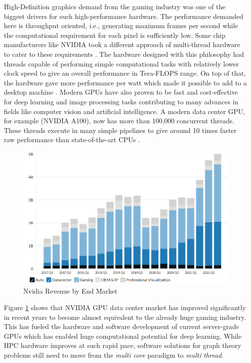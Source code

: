 High-Definition graphics demand from the gaming industry was one of the biggest drivers for such high-performance hardware. The performance demanded here is throughput oriented, i.e., generating maximum frames per second while the computational requirement for each pixel is sufficiently low.
Some chip manufacturers like NVIDIA took a different approach of multi-thread hardware  to cater to these requirements \cite{GPUs_and_gaming}.
The hardware designed with this philosophy had threads capable of performing simple computational tasks with relatively lower clock speed to give an overall performance in Tera-FLOPS range. On top of that, the hardware gave more performance per watt which made it possible to add to a desktop machine \cite{ppw_gpu_vs_cpu}.
Modern GPUs have also proven to be fast and cost-effective for deep learning and image processing tasks contributing to many advances in fields like computer vision and artificial intelligence. A modern data center GPU, for example (NVIDIA A100), now has more than 100,000 concurrent threads. These threads execute in many simple pipelines to give around 10 times faster raw performance than state-of-the-art CPUs \cite{GPU_book_wen-mei}.
\begin{figure}
    \includegraphics[width=\textwidth]{fig/Nvidia-revenue-by-end-market.png}
    \caption{Nvidia Revenue by End Market}
    \label{fig:Nvidia-revenue}
\end{figure}

Figure \ref{fig:Nvidia-revenue} shows that NVIDIA GPU data center market has improved significantly in recent years to become almost equivalent to the already huge gaming industry.
This has fueled the hardware and software development of current server-grade GPUs which has enabled huge computational potential for deep learning.
While HPC hardware improves at such rapid pace, software solutions for graph theory problems still need to move from the \textit{multi core} paradigm to \textit{multi thread}.

